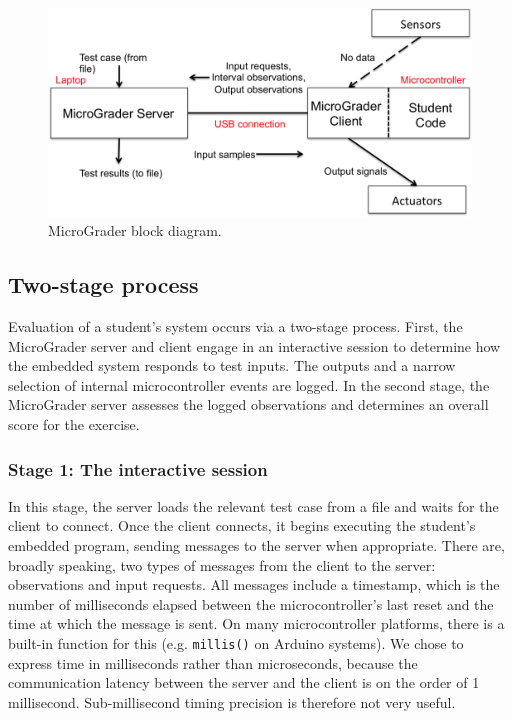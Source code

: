 \documentclass[12pt]{article}
\begin{document}
\begin{figure}[h]
\centering
\includegraphics[width=\linewidth]{test-mode.png}
\caption{MicroGrader block diagram.}
\label{fig:test-mode}
\end{figure}

\subsection{Two-stage process}
Evaluation of a student's system occurs via a two-stage process.  First, the MicroGrader server and client engage in an interactive session to determine how the embedded system responds to test inputs.  The outputs and a narrow selection of internal microcontroller events are logged.  In the second stage, the MicroGrader server assesses the logged observations and determines an overall score for the exercise.

\subsubsection{Stage 1: The interactive session}
In this stage, the server loads the relevant test case from a file and waits for the client to connect.  Once the client connects, it begins executing the student's embedded program, sending messages to the server when appropriate.  There are, broadly speaking, two types of messages from the client to the server: observations and input requests.  All messages include a timestamp, which is the number of milliseconds elapsed between the microcontroller's last reset and the time at which the message is sent.  On many microcontroller platforms, there is a built-in function for this (e.g. \texttt{millis()} on Arduino systems).  We chose to express time in milliseconds rather than microseconds, because the communication latency between the server and the client is on the order of 1 millisecond.  Sub-millisecond timing precision is therefore not very useful.
\end{document}
